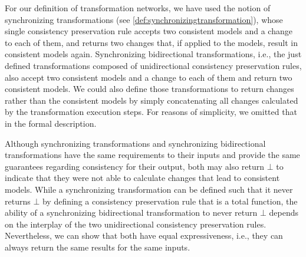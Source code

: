 For our definition of transformation networks, we have used the notion of synchronizing transformations (see \autoref{def:synchronizingtransformation}), whose single consistency preservation rule accepts two consistent models and a change to each of them, and returns two changes that, if applied to the models, result in consistent models again.
Synchronizing bidirectional transformations, i.e., the just defined transformations composed of unidirectional consistency preservation rules, also accept two consistent models and a change to each of them and return two consistent models.
We could also define those transformations to return changes rather than the consistent models by simply concatenating all changes calculated by the transformation execution steps.
For reasons of simplicity, we omitted that in the formal description.

Although synchronizing transformations and synchronizing bidirectional transformations have the same requirements to their inputs and provide the same guarantees regarding consistency for their output, both may also return $\bot$ to indicate that they were not able to calculate changes that lead to consistent models.
While a synchronizing transformation can be defined such that it never returns $\bot$ by defining a consistency preservation rule that is a total function, the ability of a synchronizing bidirectional transformation to never return $\bot$ depends on the interplay of the two unidirectional consistency preservation rules.
Nevertheless, we can show that both have equal expressiveness, i.e., they can always return the same results for the same inputs.

